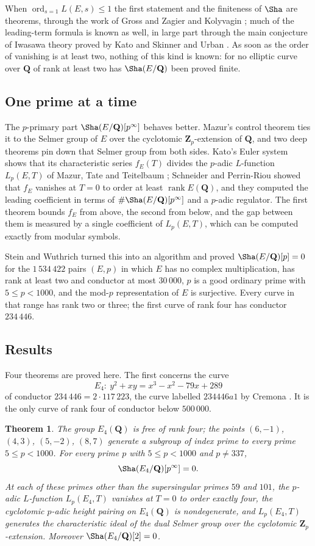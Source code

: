 \documentclass[11pt]{amsart}
\newtheorem{mainthm}{Theorem}
\theoremstyle{definition}
\newcommand{\Q}{\mathbf{Q}}
\newcommand{\Z}{\mathbf{Z}}
\newcommand{\rk}{\operatorname{rank}}
\newcommand{\ord}{\operatorname{ord}}
\begin{document}
When $\ord_{s=1}L(E,s)\le1$ the first statement and the finiteness of $\Sha$ are theorems, through the work of Gross and Zagier \cite{GZ86} and Kolyvagin \cite{Kol90}; much of the leading-term formula is known as well, in large part through the main conjecture of Iwasawa theory proved by Kato \cite{Kat04} and Skinner and Urban \cite{SU14}. As soon as the order of vanishing is at least two, nothing of this kind is known: for no elliptic curve over $\Q$ of rank at least two has $\Sha(E/\Q)$ been proved finite.

\subsection{One prime at a time}
The $p$-primary part $\Sha(E/\Q)[p^\infty]$ behaves better. Mazur's control theorem \cite{Maz72} ties it to the Selmer group of $E$ over the cyclotomic $\Z_p$-extension of $\Q$, and two deep theorems pin down that Selmer group from both sides. Kato's Euler system shows that its characteristic series $f_E(T)$ divides the $p$-adic $L$-function $L_p(E,T)$ of Mazur, Tate and Teitelbaum \cite{MTT86}; Schneider \cite{Sch82,Sch85} and Perrin-Riou \cite{PR93} showed that $f_E$ vanishes at $T=0$ to order at least $\rk E(\Q)$, and they computed the leading coefficient in terms of $\#\Sha(E/\Q)[p^\infty]$ and a $p$-adic regulator. The first theorem bounds $f_E$ from above, the second from below, and the gap between them is measured by a single coefficient of $L_p(E,T)$, which can be computed exactly from modular symbols.

Stein and Wuthrich \cite{SW13} turned this into an algorithm and proved $\Sha(E/\Q)[p]=0$ for the $1\,534\,422$ pairs $(E,p)$ in which $E$ has no complex multiplication, has rank at least two and conductor at most $30\,000$, $p$ is a good ordinary prime with $5\le p<1000$, and the mod-$p$ representation of $E$ is surjective. Every curve in that range has rank two or three; the first curve of rank four has conductor $234\,446$.

\subsection{Results}
Four theorems are proved here. The first concerns the curve
\[
E_4\colon\ y^2+xy=x^3-x^2-79x+289
\]
of conductor $234\,446=2\cdot117\,223$, the curve labelled $234446a1$ by Cremona \cite{Cre97}. It is the only curve of rank four of conductor below $500\,000$.

\begin{mainthm}\label{thm:A}
The group $E_4(\Q)$ is free of rank four; the points $(6,-1)$, $(4,3)$, $(5,-2)$, $(8,7)$ generate a subgroup of index prime to every prime $5\le p<1000$. For every prime $p$ with $5\le p<1000$ and $p\ne337$,
\[
\Sha(E_4/\Q)[p^\infty]=0 .
\]
At each of these primes other than the supersingular primes $59$ and $101$, the $p$-adic $L$-function $L_p(E_4,T)$ vanishes at $T=0$ to order exactly four, the cyclotomic $p$-adic height pairing on $E_4(\Q)$ is nondegenerate, and $L_p(E_4,T)$ generates the characteristic ideal of the dual Selmer group over the cyclotomic $\Z_p$-extension. Moreover $\Sha(E_4/\Q)[2]=0$.
\end{mainthm}
\end{document}
